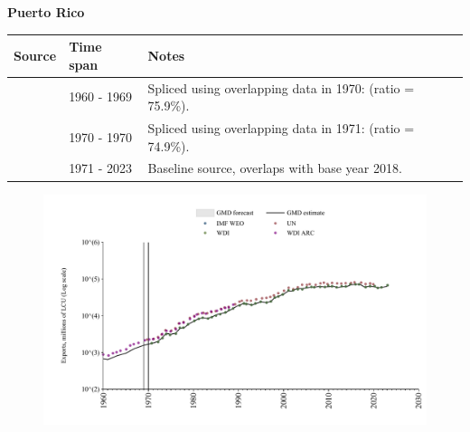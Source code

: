 \documentclass[12pt,a4paper,landscape]{article}
\begin{document}
\begin{adjustbox}{max totalsize={\paperwidth}{\paperheight},center}
\begin{minipage}[t][\textheight][t]{\textwidth}
\vspace*{0.5cm}
{}
\begin{center}
{\Large\bfseries Puerto Rico}
\end{center}
\vspace{0.5cm}
\begin{table}[H]
\centering
\small
\begin{tabular}{|l|l|l|}
\hline
\textbf{Source} & \textbf{Time span} & \textbf{Notes} \\
\hline
\rowcolor{white}\cite{WDI_ARC}& 1960 - 1969 &Spliced using overlapping data in 1970: (ratio = 75.9\%).\\
\rowcolor{lightgray}\cite{UN}& 1970 - 1970 &Spliced using overlapping data in 1971: (ratio = 74.9\%).\\
\rowcolor{white}\cite{WDI}& 1971 - 2023 &Baseline source, overlaps with base year 2018.\\
\hline
\end{tabular}
\end{table}
\begin{figure}[H]
\centering
\includegraphics[width=\textwidth,height=0.6\textheight,keepaspectratio]{graphs/PRI_exports.pdf}
\end{figure}
\end{minipage}
\end{adjustbox}
\end{document}
